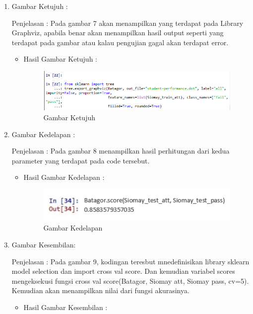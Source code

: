 \begin{itemize}
\begin{enumerate}
\begin{itemize}
\end{itemize}
\item  Gambar Ketujuh :
\par Penjelasan : Pada gambar 7 akan menampilkan yang terdapat pada Library Graphviz, apabila benar akan menampilkan hasil output seperti yang terdapat pada gambar atau kalau pengujian gagal akan terdapat error.
\par 
\begin{itemize}
\par
\item Hasil  Gambar Ketujuh :

\begin{figure}[ht]
\centering
\includegraphics[scale=0.6]{figures/AIP/jd7.PNG}
\caption{ Gambar Ketujuh}
\label{7}
\end{figure}


\end{itemize}
\item  Gambar Kedelapan :
\par Penjelasan : Pada gambar 8 menampilkan hasil perhitungan dari kedua parameter yang terdapat pada code tersebut.
\par 
\begin{itemize}
\par
\item Hasil  Gambar Kedelapan :

\begin{figure}[ht]
\centering
\includegraphics[scale=0.8]{figures/AIP/jd8.PNG}
\caption{ Gambar Kedelapan}
\label{8}
\end{figure}


\end{itemize}
\item  Gambar Kesembilan:
\par Penjelasan : Pada gambar 9, kodingan teresbut mnedefinisikan library sklearn model selection dan import cross val score. Dan kemudian variabel scores mengeksekusi fungsi cross val score(Batagor, Siomay att, Siomay pass, cv=5). Kemudian akan menampilkan nilai dari fungsi akurasinya.
\par 
\begin{itemize}
\par
\item Hasil  Gambar Kesembilan :


\end{itemize}
\end{enumerate}
\end{itemize}
